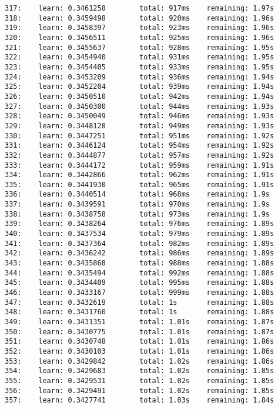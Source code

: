 \documentclass[11pt]{article}
\begin{document}
\begin{Verbatim}[commandchars=\\\{\}]
317:    learn: 0.3461258        total: 917ms    remaining: 1.97s
318:    learn: 0.3459498        total: 920ms    remaining: 1.96s
319:    learn: 0.3458397        total: 923ms    remaining: 1.96s
320:    learn: 0.3456511        total: 925ms    remaining: 1.96s
321:    learn: 0.3455637        total: 928ms    remaining: 1.95s
322:    learn: 0.3454940        total: 931ms    remaining: 1.95s
323:    learn: 0.3454405        total: 933ms    remaining: 1.95s
324:    learn: 0.3453209        total: 936ms    remaining: 1.94s
325:    learn: 0.3452204        total: 939ms    remaining: 1.94s
326:    learn: 0.3450510        total: 942ms    remaining: 1.94s
327:    learn: 0.3450300        total: 944ms    remaining: 1.93s
328:    learn: 0.3450049        total: 946ms    remaining: 1.93s
329:    learn: 0.3448128        total: 949ms    remaining: 1.93s
330:    learn: 0.3447251        total: 951ms    remaining: 1.92s
331:    learn: 0.3446124        total: 954ms    remaining: 1.92s
332:    learn: 0.3444877        total: 957ms    remaining: 1.92s
333:    learn: 0.3444172        total: 959ms    remaining: 1.91s
334:    learn: 0.3442866        total: 962ms    remaining: 1.91s
335:    learn: 0.3441930        total: 965ms    remaining: 1.91s
336:    learn: 0.3440514        total: 968ms    remaining: 1.9s
337:    learn: 0.3439591        total: 970ms    remaining: 1.9s
338:    learn: 0.3438758        total: 973ms    remaining: 1.9s
339:    learn: 0.3438264        total: 976ms    remaining: 1.89s
340:    learn: 0.3437534        total: 979ms    remaining: 1.89s
341:    learn: 0.3437364        total: 982ms    remaining: 1.89s
342:    learn: 0.3436242        total: 986ms    remaining: 1.89s
343:    learn: 0.3435868        total: 988ms    remaining: 1.88s
344:    learn: 0.3435494        total: 992ms    remaining: 1.88s
345:    learn: 0.3434409        total: 995ms    remaining: 1.88s
346:    learn: 0.3433167        total: 999ms    remaining: 1.88s
347:    learn: 0.3432619        total: 1s       remaining: 1.88s
348:    learn: 0.3431760        total: 1s       remaining: 1.88s
349:    learn: 0.3431351        total: 1.01s    remaining: 1.87s
350:    learn: 0.3430775        total: 1.01s    remaining: 1.87s
351:    learn: 0.3430748        total: 1.01s    remaining: 1.86s
352:    learn: 0.3430103        total: 1.01s    remaining: 1.86s
353:    learn: 0.3429842        total: 1.02s    remaining: 1.86s
354:    learn: 0.3429683        total: 1.02s    remaining: 1.85s
355:    learn: 0.3429531        total: 1.02s    remaining: 1.85s
356:    learn: 0.3429491        total: 1.02s    remaining: 1.85s
357:    learn: 0.3427741        total: 1.03s    remaining: 1.84s

\end{Verbatim}
\end{document}
